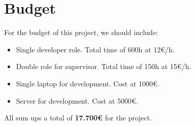 \clearpage\section{Budget}
For the budget of this project, we should include:
\begin{itemize}
	\item{Single developer role. Total time of 600h at 12€/h.}
	\item{Double role for supervisor. Total time of 150h at 15€/h.}
	\item{Single laptop for development. Cost at 1000€.}
	\item{Server for development. Cost at 5000€.}
\end{itemize}
All sum ups a total of \textbf{17.700€} for the project.
